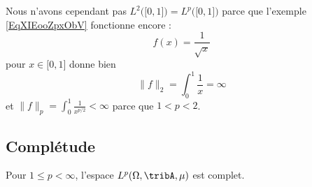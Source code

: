 \begin{remark}
    Nous n'avons cependant pas \( L^2\big( \mathopen[ 0 , 1 \mathclose] \big)=L^p\big( \mathopen[ 0 , 1 \mathclose] \big)\) parce que l'exemple \eqref{EqXIEooZpxObV} fonctionne encore :
    \begin{equation}
        f(x)=\frac{1}{ \sqrt{x} }
    \end{equation}
    pour \( x\in\mathopen[ 0 , 1 \mathclose]\) donne bien
    \begin{equation}
        \| f \|_2=\int_0^1\frac{1}{ x }=\infty
    \end{equation}
    et \( \| f \|_p=\int_0^1\frac{1}{ x^{p/2} }<\infty\) parce que \( 1<p<2\).
\end{remark}

\subsection{Complétude}

\begin{theorem}  \label{ThoUYBDWQX}
    Pour \( 1\leq p<\infty\), l'espace \( L^p(\Omega,\tribA,\mu)\) est complet.
\end{theorem}

